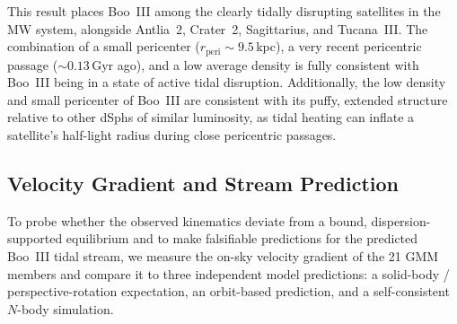 \documentclass[twocolumn]{aastex631}
\begin{document}
This result places Boo~III among the clearly tidally disrupting satellites in the MW system, alongside Antlia~2, Crater~2, Sagittarius, and Tucana~III. The combination of a small pericenter ($r_{\mathrm{peri}} \sim 9.5$\,kpc), a very recent pericentric passage ($\sim 0.13$\,Gyr ago), and a low average density is fully consistent with Boo~III being in a state of active tidal disruption. Additionally, the low density and small pericenter of Boo~III are consistent with its puffy, extended structure relative to other dSphs of similar luminosity, as tidal heating can inflate a satellite's half-light radius during close pericentric passages.

\subsection{Velocity Gradient and Stream Prediction} \label{section:gradient}

To probe whether the observed kinematics deviate from a bound, dispersion-supported equilibrium and to make falsifiable predictions for the predicted Boo~III tidal stream, we measure the on-sky velocity gradient of the 21 GMM members and compare it to three independent model predictions: a solid-body / perspective-rotation expectation, an orbit-based prediction, and a self-consistent $N$-body simulation.  
\end{document}
